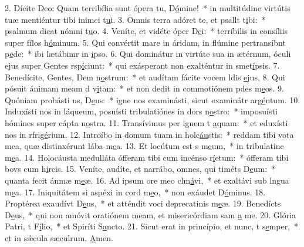 2. Dícite Deo: Quam terribília sunt ópera tu, D\uline{ó}mine!~* in multitúdine virtútis tuæ mentiéntur tibi inimci t\uline{u}i.
3. Omnis terra adóret te, et psallt t\uline{i}bi:~* psalmum dicat nómni t\uline{u}o.
4. Veníte, et vidéte óper D\uline{e}i:~* terríbilis in consíliis super fílos h\uline{ó}minum.
5. Qui convértit mare in áridam, in flúmine pertransíbnt p\uline{e}de:~* ibi lætábimr in \uline{i}pso.
6. Qui dominátur in virtúte sua in ætérnum, óculi ejus super Gentes rsp\uline{í}ciunt:~* qui exásperant non exalténtur in smet\uline{í}psis.
7. Benedícite, Gentes, Dem n\uline{o}strum:~* et audítam fácite vocem ldis \uline{e}jus,
8. Qui pósuit ánimam meam d v\uline{i}tam:~* et non dedit in commotiónem pdes m\uline{e}os.
9. Quóniam probásti ns, D\uline{e}us:~* igne nos examinásti, sicut examinátr arg\uline{é}ntum.
10. Induxísti nos in láqueum, posuísti tribulatiónes in dors n\uline{o}stro:~* imposuísti hómines super cápta n\uline{o}stra.
11. Transívimus per ignem t \uline{a}quam:~* et eduxísti nos in rfrig\uline{é}rium.
12. Introíbo in domum tuam in holc\uline{áu}stis:~* reddam tibi vota mea, quæ distinxérunt lába m\uline{e}a.
13. Et locútum est s m\uline{e}um,~* in tribulatine m\uline{e}a.
14. Holocáusta medulláta ófferam tibi cum incénso r\uline{í}etum:~* ófferam tibi bovs cum h\uline{i}rcis.
15. Veníte, audíte, et narrábo, omnes, qui timéts D\uline{e}um:~* quanta fecit ánmæ m\uline{e}æ.
16. Ad ipsum ore meo clm\uline{á}vi,~* et exaltávi sub lngua m\uline{e}a.
17. Iniquitátem si aspéxi in cord m\uline{e}o,~* non exáudet D\uline{ó}minus.
18. Proptérea exaudívt D\uline{e}us,~* et atténdit voci deprecatinis m\uline{e}æ.
19. Benedícts D\uline{e}us,~* qui non amóvit oratiónem meam, et misericórdiam sam \uline{a} me.
20. Glória Patri, t F\uline{í}lio,~* et Spiríti S\uline{a}ncto.
21. Sicut erat in princípio, et nunc, t s\uline{e}mper,~* et in sǽcula sæculrum. \uline{A}men.
